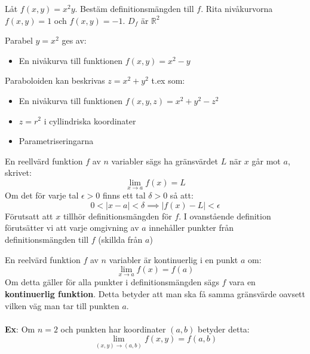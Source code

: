 \documentclass{report}
\begin{document}

\pagebreak
\qs{}
{
Låt $ f(x,y) = x^2y $. Bestäm definitionsmängden till $ f $. Rita nivåkurvorna $ f(x,y) = 1 $ och $ f(x,y) = -1 $.
}
\sol $ D_f $ är $ \mathbb{R}^2 $

\vspace{20pt}
\ex{}
{
Parabel $ y = x^2 $ ges av:
\begin{itemize}
	\item En nivåkurva till funktionen $ f(x,y) = x^2-y $
\end{itemize}
}

\ex{}
{
Paraboloiden kan beskrivas $ z = x^2+y^2 $ t.ex som:
\begin{itemize}
	\item En nivåkurva till funktionen $ f(x,y,z) = x^2+y^2-z^2 $
	\item $ z = r^2 $ i cyllindriska koordinater
	\item Parametriseringarna
\end{itemize}
}

{
En reellvärd funktion $ f $ av $ n $ variabler sägs ha gränsvärdet $ L $ när $ x $ går mot $ a $, skrivet:
\begin{equation*}
\lim_{x \to a} f(x) = L
\end{equation*}
Om det för varje tal $ \epsilon > 0 $ finns ett tal $ \delta > 0 $ så att:
\begin{equation*}
0 < |x-a| < \delta \implies  |f(x)-L| < \epsilon
\end{equation*}
Förutsatt att $ x $ tillhör definitionsmängden för $ f $. I ovanstående definition förutsätter vi att varje omgivning av $ a $ innehåller punkter från definitionsmängden till $ f $ (skillda från $ a $)
}

{
En reelvärd funktion $ f $ av $ n $ variabler är kontinuerlig i en punkt $ a $ om:
\begin{equation*}
\lim_{x \to a} f(x) = f(a)
\end{equation*}
Om detta gäller för alla punkter i definitionsmängden sägs $ f $ vara en \textbf{kontinuerlig funktion}. Detta betyder att man ska få samma gränsvärde oavsett vilken väg man tar till punkten $ a $. \\\\

\textbf{Ex}: Om $ n = 2 $ och punkten har koordinater $ (a,b) $ betyder detta:
\begin{equation*}
	\lim_{(x,y) \to (a,b)} f(x,y) = f(a,b)
\end{equation*}
}
\end{document}
